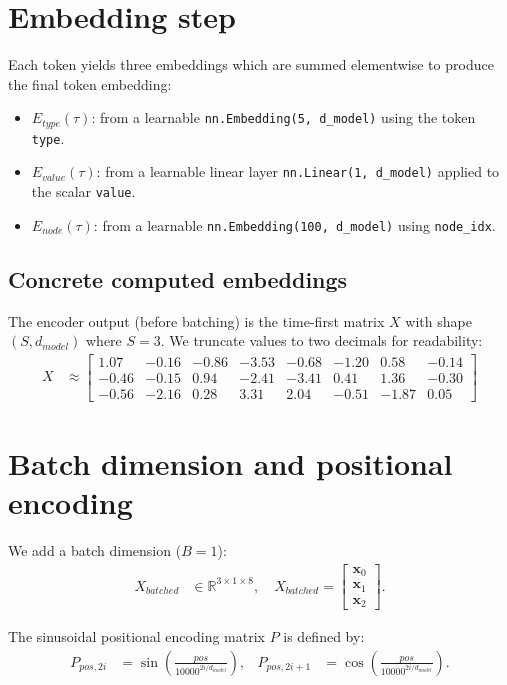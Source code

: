 \documentclass{article}
\begin{document}
\section*{Embedding step}
Each token yields three embeddings which are summed elementwise to produce the final token embedding:
\begin{itemize}
  \item $E_{type}(\tau)$: from a learnable \texttt{nn.Embedding(5, d\_model)} using the token \texttt{type}.
  \item $E_{value}(\tau)$: from a learnable linear layer \texttt{nn.Linear(1, d\_model)} applied to the scalar \texttt{value}.
  \item $E_{node}(\tau)$: from a learnable \texttt{nn.Embedding(100, d\_model)} using \texttt{node\_idx}.
\end{itemize}

\subsection*{Concrete computed embeddings}
The encoder output (before batching) is the time-first matrix $X$ with shape $(S, d_{model})$ where $S=3$.  
We truncate values to two decimals for readability:
\begin{align*}
X &\approx
\begin{bmatrix}
1.07 & -0.16 & -0.86 & -3.53 & -0.68 & -1.20 & 0.58 & -0.14 \\
-0.46 & -0.15 & 0.94 & -2.41 & -3.41 & 0.41 & 1.36 & -0.30 \\
-0.56 & -2.16 & 0.28 & 3.31 & 2.04 & -0.51 & -1.87 & 0.05
\end{bmatrix}
\end{align*}

\section*{Batch dimension and positional encoding}
We add a batch dimension ($B=1$):
\begin{align*}
X_{batched} &\in \mathbb{R}^{3 \times 1 \times 8}, \quad
X_{batched} = \begin{bmatrix} \mathbf{x}_0 \\ \mathbf{x}_1 \\ \mathbf{x}_2 \end{bmatrix}.
\end{align*}

The sinusoidal positional encoding matrix $P$ is defined by:
\begin{align*}
P_{pos,2i} &= \sin\!\left( \frac{pos}{10000^{2i/d_{model}}} \right), &
P_{pos,2i+1} &= \cos\!\left( \frac{pos}{10000^{2i/d_{model}}} \right).
\end{align*}
\end{document}

